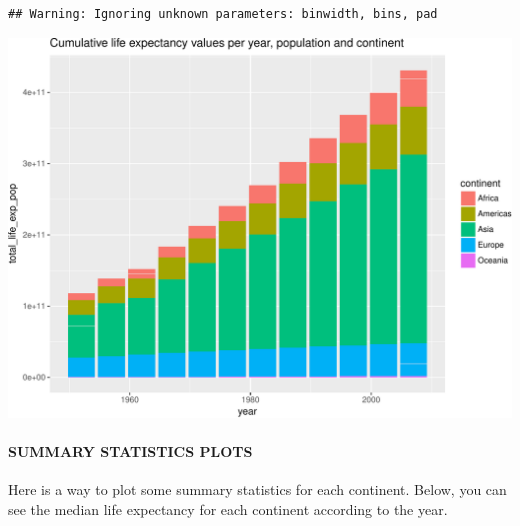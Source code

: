 \documentclass[]{article}
\newenvironment{Shaded}{\begin{snugshade}}{\end{snugshade}}
\newcommand{\KeywordTok}[1]{\textcolor[rgb]{0.13,0.29,0.53}{\textbf{{#1}}}}
\newcommand{\DataTypeTok}[1]{\textcolor[rgb]{0.13,0.29,0.53}{{#1}}}
\newcommand{\StringTok}[1]{\textcolor[rgb]{0.31,0.60,0.02}{{#1}}}
\newcommand{\NormalTok}[1]{{#1}}
\let\oldparagraph\paragraph
\renewcommand{\paragraph}[1]{\oldparagraph{#1}\mbox{}}
\begin{document}
\begin{verbatim}
## Warning: Ignoring unknown parameters: binwidth, bins, pad
\end{verbatim}

\includegraphics{gapminder-exploration-phase2_files/figure-latex/unnamed-chunk-19-1.pdf}

\paragraph{SUMMARY STATISTICS PLOTS}\label{summary-statistics-plots}

Here is a way to plot some summary statistics for each continent. Below,
you can see the median life expectancy for each continent according to
the year.

\begin{Shaded}
\end{Shaded}
\end{document}
